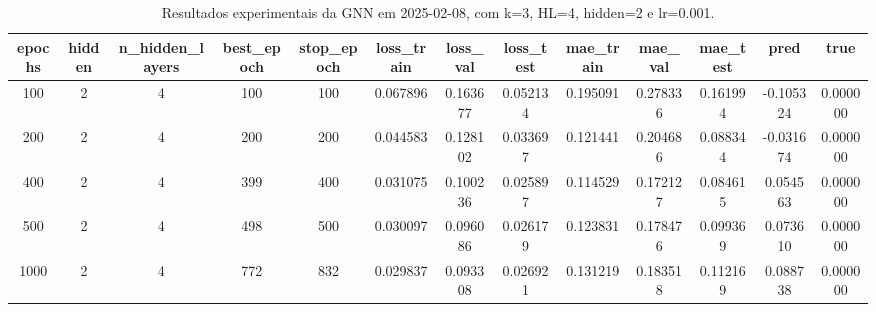 \begin{table}[h]
\centering
\caption{Resultados experimentais da GNN em 2025-02-08, com k=3, HL=4, hidden=2 e lr=0.001.}
\label{tab:gnn_results_k3_hl4_h2_d20250208}
\begin{tabular}{ccccccccccccc}
\toprule
epochs & hidden & n\_hidden\_layers & best\_epoch & stop\_epoch & loss\_train & loss\_val & loss\_test & mae\_train & mae\_val & mae\_test & pred & true \\
\midrule
100 & 2 & 4 & 100 & 100 & 0.067896 & 0.163677 & 0.052134 & 0.195091 & 0.278336 & 0.161994 & -0.105324 & 0.000000 \\
200 & 2 & 4 & 200 & 200 & 0.044583 & 0.128102 & 0.033697 & 0.121441 & 0.204686 & 0.088344 & -0.031674 & 0.000000 \\
400 & 2 & 4 & 399 & 400 & 0.031075 & 0.100236 & 0.025897 & 0.114529 & 0.172127 & 0.084615 & 0.054563 & 0.000000 \\
500 & 2 & 4 & 498 & 500 & 0.030097 & 0.096086 & 0.026179 & 0.123831 & 0.178476 & 0.099369 & 0.073610 & 0.000000 \\
1000 & 2 & 4 & 772 & 832 & 0.029837 & 0.093308 & 0.026921 & 0.131219 & 0.183518 & 0.112169 & 0.088738 & 0.000000 \\
\bottomrule
\end{tabular}
\end{table}
